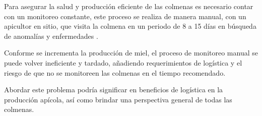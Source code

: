 Para asegurar la salud y producción eficiente de las colmenas es necesario contar con un monitoreo constante, este proceso se realiza de manera manual, con un apicultor en sitio, que visita la colmena en un periodo de 8 a 15 días en búsqueda de anomalías y enfermedades \cite{correa_benitez_2018}.

Conforme se incrementa la producción de miel, el proceso de monitoreo manual se puede volver ineficiente y tardado, añadiendo requerimientos de logística y el riesgo de que no se monitoreen las colmenas en el tiempo recomendado.

Abordar este problema podría significar en beneficios de logística en la producción apícola, así como brindar una perspectiva general de todas las colmenas.